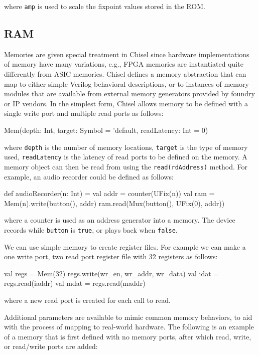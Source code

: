 \documentclass[twocolumn,10pt]{article}
\begin{document}
\noindent
where \verb+amp+ is used to scale the fixpoint values stored in the ROM.

\subsection{RAM}


Memories are given special treatment in Chisel since hardware
implementations of memory have many variations, e.g., FPGA memories
are instantiated quite differently from ASIC memories.  Chisel defines
a memory abstraction that can map to either simple Verilog behavioral
descriptions, or to instances of memory modules that are available
from external memory generators provided by foundry or IP vendors.  In
the simplest form, Chisel allows memory to be defined with a single
write port and multiple read ports as follows:

\begin{scala}
  Mem(depth: Int, 
      target: Symbol = 'default, readLatency: Int = 0)
\end{scala}

\noindent
where \verb+depth+ is the number of memory locations, \verb+target+ is the
type of memory used, \verb+readLatency+ is the latency of read ports to be
defined on the memory.
A memory object can then
be read from using the \verb+read(rdAddress)+ method.  For example, an
audio recorder could be defined as follows:

\begin{scala}
  def audioRecorder(n: Int) = { 
    val addr = counter(UFix(n))
    val ram = Mem(n).write(button(), addr)
    ram.read(Mux(button(), UFix(0), addr))
  } 
\end{scala}

\noindent
where a counter is used as an address generator into a memory.  
The device records while \verb+button+ is \verb+true+, or plays back when \verb+false+.

We can use simple memory to create register files.
For example we can make a one write port, two read port register file with 32 registers as follows:

\begin{scala}
  val regs = Mem(32)
  regs.write(wr_en, wr_addr, wr_data)
  val idat = regs.read(iaddr)
  val mdat = regs.read(maddr)
\end{scala}

\noindent
where a new read port is created for each call to read.

Additional parameters are available to mimic common memory behaviors,
to aid with the process of mapping to real-world hardware.  The
following is an example of a memory that is first defined with no
memory ports, after which read, write, or read/write ports are added:
\end{document}
